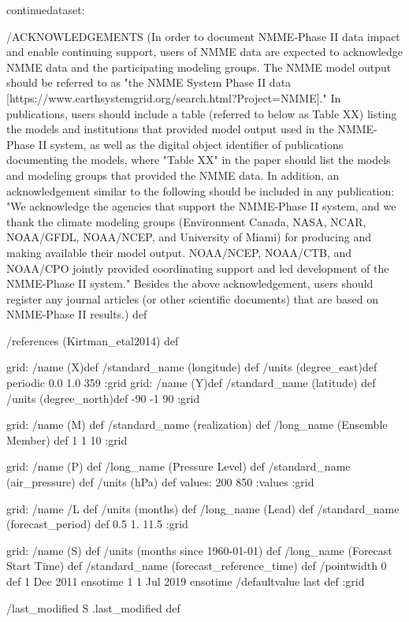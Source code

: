 \begin{ingrid}
continuedataset:

/ACKNOWLEDGEMENTS (In order to document NMME-Phase II data impact and enable continuing support, users of NMME data are expected to acknowledge NMME data and the participating modeling groups. The NMME model output should be referred to as "the NMME System Phase II data [https://www.earthsystemgrid.org/search.html?Project=NMME]."  In publications, users should include a table (referred to below as Table XX) listing the models and institutions that provided model output used in the NMME-Phase II system, as well as the digital object identifier of publications documenting the models, where "Table XX" in the paper should list the models and modeling groups that provided the NMME data.  In addition, an acknowledgement similar to the following should be included in any publication:  "We acknowledge the agencies that support the NMME-Phase II system, and we thank the climate modeling groups (Environment Canada, NASA, NCAR, NOAA/GFDL, NOAA/NCEP, and University of Miami) for producing and making available their model output. NOAA/NCEP, NOAA/CTB, and NOAA/CPO jointly provided coordinating support and led development of the NMME-Phase II system."  Besides the above acknowledgement, users should register any journal articles (or other scientific documents) that are based on NMME-Phase II results.) def

/references (Kirtman_etal2014) def

grid:
/name (X)def
/standard_name (longitude) def
/units (degree_east)def
periodic
 0.0 1.0 359
:grid
grid:
/name (Y)def
/standard_name (latitude) def
/units (degree_north)def
-90 -1 90
:grid

grid:
/name (M) def
/standard_name (realization) def
/long_name (Ensemble Member) def
1 1 10
:grid

grid:
/name (P) def
/long_name (Pressure Level) def
/standard_name (air_pressure) def
/units (hPa) def
values: 200 850 :values
:grid

grid:
/name /L def
/units (months) def
/long_name (Lead) def
/standard_name (forecast_period) def
0.5 1. 11.5
:grid

grid:
/name (S) def
/units (months since 1960-01-01) def
/long_name (Forecast Start Time) def
/standard_name (forecast_reference_time) def
/pointwidth 0 def
1 Dec 2011 ensotime
1
1 Jul 2019 ensotime
/defaultvalue { last } def
:grid

/last_modified S .last_modified def


\end{ingrid}
